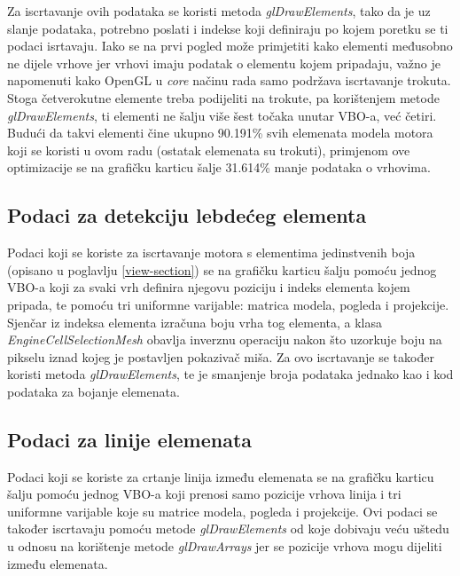 \documentclass[times, utf8, diplomski]{fer}
\begin{document}
Za iscrtavanje ovih podataka se koristi metoda \textit{glDrawElements}, tako da je uz slanje podataka, potrebno poslati i indekse koji definiraju po kojem poretku se ti podaci isrtavaju. Iako se na prvi pogled može primjetiti kako elementi međusobno ne dijele vrhove jer vrhovi imaju podatak o elementu kojem pripadaju, važno je napomenuti kako OpenGL u \textit{core} načinu rada samo podržava iscrtavanje trokuta. Stoga četverokutne elemente treba podijeliti na trokute, pa korištenjem metode \textit{glDrawElements}, ti elementi ne šalju više šest točaka unutar VBO-a, već četiri. Budući da takvi elementi čine ukupno 90.191\% svih elemenata modela motora koji se koristi u ovom radu (ostatak elemenata su trokuti), primjenom ove optimizacije se na grafičku karticu šalje 31.614\% manje podataka o vrhovima.

\subsection{Podaci za detekciju lebdećeg elementa}

Podaci koji se koriste za iscrtavanje motora s elementima jedinstvenih boja (opisano u poglavlju \ref{view-section}) se na grafičku karticu šalju pomoću jednog VBO-a koji za svaki vrh definira njegovu poziciju i indeks elementa kojem pripada, te pomoću tri uniformne varijable: matrica modela, pogleda i projekcije. Sjenčar iz indeksa elementa izračuna boju vrha tog elementa, a klasa \textit{EngineCellSelectionMesh} obavlja inverznu operaciju nakon što uzorkuje boju na pikselu iznad kojeg je postavljen pokazivač miša. Za ovo iscrtavanje se također koristi metoda \textit{glDrawElements}, te je smanjenje broja podataka jednako kao i kod podataka za bojanje elemenata.

\subsection{Podaci za linije elemenata}

Podaci koji se koriste za crtanje linija između elemenata se na grafičku karticu šalju pomoću jednog VBO-a koji prenosi samo pozicije vrhova linija i tri uniformne varijable koje su matrice modela, pogleda i projekcije. Ovi podaci se također iscrtavaju pomoću metode \textit{glDrawElements} od koje dobivaju veću uštedu u odnosu na korištenje metode \textit{glDrawArrays} jer se pozicije vrhova mogu dijeliti između elemenata.
\end{document}

